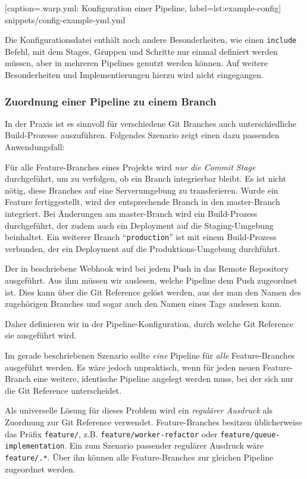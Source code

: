 
  [caption={.warp.yml: Konfiguration einer Pipeline},
  label={lst:example-config}]
  {snippets/config-example-yml.yml}

Die Konfigurationsdatei enthält noch andere Besonderheiten, wie einen \texttt{include} Befehl, mit dem Stages, Gruppen und Schritte nur einmal definiert werden müssen, aber in mehreren Pipelines genutzt werden können. Auf weitere Besonderheiten und Implementierungen hierzu wird nicht eingegangen.

\subsubsection{Zuordnung einer Pipeline zu einem Branch}
\label{subsec:git-reference}

In der Praxis ist es sinnvoll für verschiedene Git Branches auch unterschiedliche Build-Prozesse auszuführen. Folgendes Szenario zeigt einen dazu passenden Anwendungsfall:

Für alle Feature-Branches eines Projekts wird \emph{nur die Commit Stage} durchgeführt, um zu verfolgen, ob ein Branch integrierbar bleibt. Es ist nicht nötig, diese Branches auf eine Serverumgebung zu transferieren. Wurde ein Feature fertiggestellt, wird der entsprechende Branch in den master-Branch integriert. Bei Änderungen am master-Branch wird ein Build-Prozess durchgeführt, der zudem auch ein Deployment auf die Staging-Umgebung beinhaltet. Ein weiterer Branch ``\texttt{production}'' ist mit einem Build-Prozess verbunden, der ein Deployment auf die Produktions-Umgebung durchführt.

Der in  beschriebene Webhook wird bei jedem Push in das Remote Repository ausgeführt. Aus ihm müssen wir auslesen, welche Pipeline dem Push zugeordnet ist. Dies kann über die Git Reference gelöst werden, aus der man den Namen des zugehörigen Branches und sogar auch den Namen eines Tags auslesen kann.

Daher definieren wir in der Pipeline-Konfiguration, durch welche Git Reference sie ausgeführt wird.

Im gerade beschriebenen Szenario sollte \emph{eine} Pipeline für \emph{alle} Feature-Branches ausgeführt werden. Es wäre jedoch unpraktisch, wenn für jeden neuen Feature-Branch eine weitere, identische Pipeline angelegt werden muss, bei der sich nur die Git Reference unterscheidet.

Als universelle Lösung für dieses Problem wird ein \emph{regulärer Ausdruck} als Zuordnung zur Git Reference verwendet. Feature-Branches besitzen üblicherweise das Präfix \texttt{feature/}, z.B. \texttt{feature\allowbreak /worker\allowbreak -refactor} oder \texttt{feature/\allowbreak queue\allowbreak -imple\-men\-ta\-tion}. Ein zum Szenario passender regulärer Ausdruck wäre \texttt{feature/.*}. Über ihn können alle Feature-Branches zur gleichen Pipeline zugeordnet werden.

